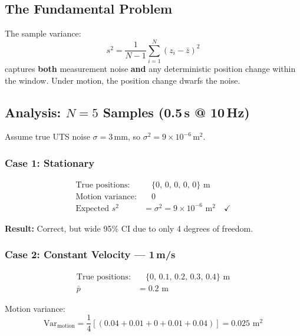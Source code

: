 \documentclass[11pt,a4paper]{article}
\begin{document}
\subsection{The Fundamental Problem}

The sample variance:
\begin{equation}
    s^2 = \frac{1}{N-1}\sum_{i=1}^{N}(z_i - \bar{z})^2
\end{equation}
captures \textbf{both} measurement noise \textbf{and} any deterministic position change within the window. Under motion, the position change dwarfs the noise.

\subsection{Analysis: $N = 5$ Samples (0.5\,s @ 10\,Hz)}

Assume true UTS noise $\sigma = 3$\,mm, so $\sigma^2 = 9 \times 10^{-6}$\,m$^2$.

\subsubsection{Case 1: Stationary}

\begin{align}
    \text{True positions:} &\quad \{0,\, 0,\, 0,\, 0,\, 0\} \text{ m} \\
    \text{Motion variance:} &\quad 0 \\
    \text{Expected } s^2 &= \sigma^2 = 9 \times 10^{-6} \text{ m}^2 \quad \checkmark
\end{align}

\textbf{Result:} Correct, but wide 95\% CI due to only 4 degrees of freedom.

\subsubsection{Case 2: Constant Velocity --- 1\,m/s}

\begin{align}
    \text{True positions:} &\quad \{0,\, 0.1,\, 0.2,\, 0.3,\, 0.4\} \text{ m} \\
    \bar{p} &= 0.2 \text{ m}
\end{align}

Motion variance:
\begin{equation}
    \text{Var}_{\mathrm{motion}} = \frac{1}{4}\left[(0.04 + 0.01 + 0 + 0.01 + 0.04)\right] = 0.025 \text{ m}^2
\end{equation}
\end{document}
